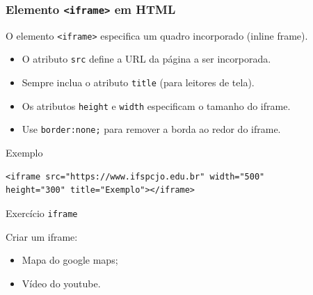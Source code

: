 \documentclass{beamer}
\begin{document}
\begin{frame}[fragile]
  \frametitle{Elemento \texttt{<iframe>} em HTML}

  O elemento \texttt{<iframe>} especifica um quadro incorporado (inline frame).

  \begin{itemize}
    \item O atributo \texttt{src} define a URL da página a ser incorporada.
    \item Sempre inclua o atributo \texttt{title} (para leitores de tela).
    \item Os atributos \texttt{height} e \texttt{width} especificam o tamanho do iframe.
    \item Use \texttt{border:none;} para remover a borda ao redor do iframe.
  \end{itemize}

  \vspace{1em}

\begin{block}{Exemplo}
\begin{verbatim}
<iframe src="https://www.ifspcjo.edu.br" width="500" 
height="300" title="Exemplo"></iframe>
\end{verbatim}    
\end{block}
  
\end{frame}


\begin{frame}{Exercício \texttt{iframe}}

Criar um iframe: 
\begin{itemize}
    \item Mapa do google maps;
    \item Vídeo do youtube.
\end{itemize}
    
\end{frame}
\end{document}
